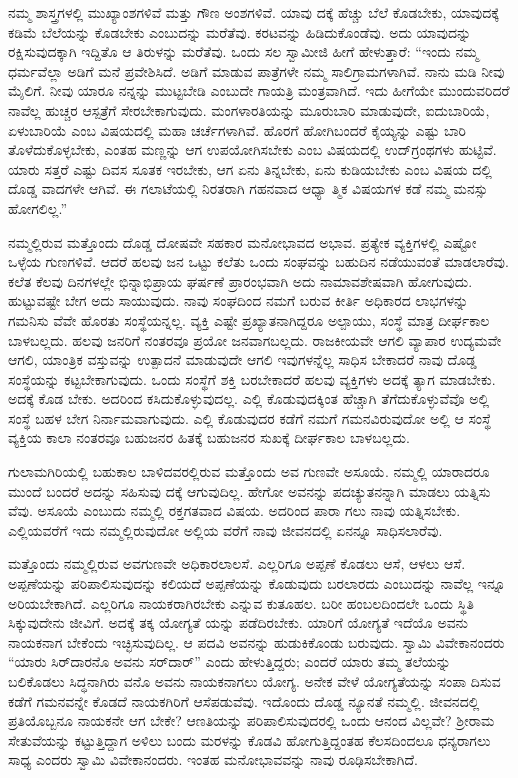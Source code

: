 ನಮ್ಮ ಶಾಸ್ತ್ರಗಳಲ್ಲಿ ಮುಖ್ಯಾಂಶಗಳಿವೆ ಮತ್ತು ಗೌಣ ಅಂಶಗಳಿವೆ. ಯಾವು ದಕ್ಕೆ ಹೆಚ್ಚು ಬೆಲೆ ಕೊಡಬೇಕು, ಯಾವುದಕ್ಕೆ ಕಡಿಮೆ ಬೆಲೆಯನ್ನು ಕೊಡಬೇಕು ಎಂಬುದನ್ನು ಮರೆತೆವು. ಕರಟವನ್ನು ಹಿಡಿದುಕೊಂಡೆವು. ಅದು ಯಾವುದನ್ನು ರಕ್ಷಿಸುವುದಕ್ಕಾಗಿ ಇದ್ದಿತೊ ಆ ತಿರುಳನ್ನು ಮರೆತೆವು. ಒಂದು ಸಲ ಸ್ವಾಮೀಜಿ ಹೀಗೆ ಹೇಳುತ್ತಾರೆ: “ಇಂದು ನಮ್ಮ ಧರ್ಮವೆಲ್ಲಾ ಅಡಿಗೆ ಮನೆ ಪ್ರವೇಶಿಸಿದೆ. ಅಡಿಗೆ ಮಾಡುವ ಪಾತ್ರೆಗಳೇ ನಮ್ಮ ಸಾಲಿಗ್ರಾಮಗಳಾಗಿವೆ. ನಾನು ಮಡಿ ನೀವು ಮೈಲಿಗೆ. ನೀವು ಯಾರೂ ನನ್ನನ್ನು ಮುಟ್ಟಬೇಡಿ ಎಂಬುದೇ ಗಾಯತ್ರಿ ಮಂತ್ರವಾಗಿದೆ. ಇದು ಹೀಗೆಯೇ ಮುಂದುವರಿದರೆ ನಾವೆಲ್ಲ ಹುಚ್ಚರ ಆಸ್ಪತ್ರೆಗೆ ಸೇರಬೇಕಾಗುವುದು. ಮಂಗಳಾರತಿಯನ್ನು ಮೂರುಬಾರಿ ಮಾಡುವುದೇ, ಐದುಬಾರಿಯೆ, ಏಳುಬಾರಿಯೆ ಎಂಬ ವಿಷಯದಲ್ಲಿ ಮಹಾ ಚರ್ಚೆಗಳಾಗಿವೆ. ಹೊರಗೆ ಹೋಗಿಬಂದರೆ ಕೈಯ್ಯನ್ನು ಎಷ್ಟು ಬಾರಿ ತೊಳೆದುಕೊಳ್ಳಬೇಕು, ಎಂತಹ ಮಣ್ಣನ್ನು ಆಗ ಉಪಯೋಗಿಸಬೇಕು ಎಂಬ ವಿಷಯದಲ್ಲಿ ಉದ್​ಗ್ರಂಥಗಳು ಹುಟ್ಟಿವೆ. ಯಾರು ಸತ್ತರೆ ಎಷ್ಟು ದಿವಸ ಸೂತಕ ಇರಬೇಕು, ಆಗ ಏನು ತಿನ್ನಬೇಕು, ಏನು ಕುಡಿಯಬೇಕು ಎಂಬ ವಿಷಯ ದಲ್ಲಿ ದೊಡ್ಡ ವಾದಗಳೇ ಆಗಿವೆ. ಈ ಗಲಾಟೆಯಲ್ಲಿ ನಿರತರಾಗಿ ಗಹನವಾದ ಆಧ್ಯಾ ತ್ಮಿಕ ವಿಷಯಗಳ ಕಡೆ ನಮ್ಮ ಮನಸ್ಸು ಹೋಗಲಿಲ್ಲ.”

ನಮ್ಮಲ್ಲಿರುವ ಮತ್ತೊಂದು ದೊಡ್ಡ ದೋಷವೇ ಸಹಕಾರ ಮನೋಭಾವದ ಅಭಾವ. ಪ್ರತ್ಯೇಕ ವ್ಯಕ್ತಿಗಳಲ್ಲಿ ಎಷ್ಟೋ ಒಳ್ಳೆಯ ಗುಣಗಳಿವೆ. ಆದರೆ ಹಲವು ಜನ ಒಟ್ಟು ಕಲೆತು ಒಂದು ಸಂಘವನ್ನು ಬಹುದಿನ ನಡೆಯುವಂತೆ ಮಾಡಲಾರೆವು. ಕಲೆತ ಕೆಲವು ದಿನಗಳಲ್ಲೇ ಭಿನ್ನಾಭಿಪ್ರಾಯ ಘರ್ಷಣೆ ಪ್ರಾರಂಭವಾಗಿ ಅದು ನಾಮಾವಶೇಷವಾಗಿ ಹೋಗುವುದು. ಹುಟ್ಟುವಷ್ಟೇ ಬೇಗ ಅದು ಸಾಯುವುದು. ನಾವು ಸಂಘದಿಂದ ನಮಗೆ ಬರುವ ಕೀರ್ತಿ ಅಧಿಕಾರದ ಲಾಭಗಳನ್ನು ಗಮನಿಸು ವೆವೇ ಹೊರತು ಸಂಸ್ಥೆಯನ್ನಲ್ಲ. ವ್ಯಕ್ತಿ ಎಷ್ಟೇ ಪ್ರಖ್ಯಾತನಾಗಿದ್ದರೂ ಅಲ್ಪಾಯು, ಸಂಸ್ಥೆ ಮಾತ್ರ ದೀರ್ಘಕಾಲ ಬಾಳಬಲ್ಲದು. ಹಲವು ಜನರಿಗೆ ನಂತರವೂ ಪ್ರಯೋ ಜನವಾಗಬಲ್ಲದು. ರಾಜಕೀಯವೇ ಆಗಲಿ ವ್ಯಾಪಾರ ಉದ್ಯಮವೇ ಆಗಲಿ, ಯಾಂತ್ರಿಕ ವಸ್ತುವನ್ನು ಉತ್ಪಾದನೆ ಮಾಡುವುದೇ ಆಗಲಿ ಇವುಗಳನ್ನೆಲ್ಲ ಸಾಧಿಸ ಬೇಕಾದರೆ ನಾವು ದೊಡ್ಡ ಸಂಸ್ಥೆಯನ್ನು ಕಟ್ಟಬೇಕಾಗುವುದು. ಒಂದು ಸಂಸ್ಥೆಗೆ ಶಕ್ತಿ ಬರಬೇಕಾದರೆ ಹಲವು ವ್ಯಕ್ತಿಗಳು ಅದಕ್ಕೆ ತ್ಯಾಗ ಮಾಡಬೇಕು. ಅದಕ್ಕೆ ಕೊಡ ಬೇಕು. ಅದರಿಂದ ಕಸಿದುಕೊಳ್ಳುವುದಲ್ಲ. ಎಲ್ಲಿ ಕೊಡುವುದಕ್ಕಿಂತ ಹೆಚ್ಚಾಗಿ ತೆಗೆದುಕೊಳ್ಳುವೆವೊ ಅಲ್ಲಿ ಸಂಸ್ಥೆ ಬಹಳ ಬೇಗ ನಿರ್ನಾಮವಾಗುವುದು. ಎಲ್ಲಿ ಕೊಡುವುದರ ಕಡೆಗೆ ನಮಗೆ ಗಮನವಿರುವುದೋ ಅಲ್ಲಿ ಆ ಸಂಸ್ಥೆ ವ್ಯಕ್ತಿಯ ಕಾಲಾ ನಂತರವೂ ಬಹುಜನರ ಹಿತಕ್ಕೆ ಬಹುಜನರ ಸುಖಕ್ಕೆ ದೀರ್ಘಕಾಲ ಬಾಳಬಲ್ಲದು.

ಗುಲಾಮಗಿರಿಯಲ್ಲಿ ಬಹುಕಾಲ ಬಾಳಿದವರಲ್ಲಿರುವ ಮತ್ತೊಂದು ಅವ ಗುಣವೇ ಅಸೂಯೆ. ನಮ್ಮಲ್ಲಿ ಯಾರಾದರೂ ಮುಂದೆ ಬಂದರೆ ಅದನ್ನು ಸಹಿಸುವು ದಕ್ಕೆ ಆಗುವುದಿಲ್ಲ. ಹೇಗೋ ಅವನನ್ನು ಪದಚ್ಯುತನನ್ನಾಗಿ ಮಾಡಲು ಯತ್ನಿಸು ವೆವು. ಅಸೂಯೆ ಎಂಬುದು ನಮ್ಮಲ್ಲಿ ರಕ್ತಗತವಾದ ವಿಷಯ. ಅದರಿಂದ ಪಾರಾ ಗಲು ನಾವು ಯತ್ನಿಸಬೇಕು. ಎಲ್ಲಿಯವರೆಗೆ ಇದು ನಮ್ಮಲ್ಲಿರುವುದೋ ಅಲ್ಲಿಯ ವರೆಗೆ ನಾವು ಜೀವನದಲ್ಲಿ ಏನನ್ನೂ ಸಾಧಿಸಲಾರೆವು.

ಮತ್ತೊಂದು ನಮ್ಮಲ್ಲಿರುವ ಅವಗುಣವೇ ಅಧಿಕಾರಲಾಲಸೆ. ಎಲ್ಲರಿಗೂ ಅಪ್ಪಣೆ ಕೊಡಲು ಆಸೆ, ಆಳಲು ಆಸೆ. ಅಪ್ಪಣೆಯನ್ನು ಪರಿಪಾಲಿಸುವುದನ್ನು ಕಲಿಯದೆ ಅಪ್ಪಣೆಯನ್ನು ಕೊಡುವುದು ಬರಲಾರದು ಎಂಬುದನ್ನು ನಾವೆಲ್ಲ ಇನ್ನೂ ಅರಿಯಬೇಕಾಗಿದೆ. ಎಲ್ಲರಿಗೂ ನಾಯಕರಾಗಿರಬೇಕು ಎನ್ನುವ ಕುತೂಹಲ. ಬರೀ ಹಂಬಲದಿಂದಲೇ ಒಂದು ಸ್ಥಿತಿ ಸಿಕ್ಕುವುದೇನು ಜೀವಿಗೆ. ಅದಕ್ಕೆ ತಕ್ಕ ಯೋಗ್ಯತೆ ಯನ್ನು ಪಡೆದಿರಬೇಕು. ಯಾರಿಗೆ ಯೋಗ್ಯತೆ ಇದೆಯೊ ಅವನು ನಾಯಕನಾಗ ಬೇಕೆಂದು ಇಚ್ಛಿಸುವುದಿಲ್ಲ. ಆ ಪದವಿ ಅವನನ್ನು ಹುಡುಕಿಕೊಂಡು ಬರುವುದು. ಸ್ವಾಮಿ ವಿವೇಕಾನಂದರು “ಯಾರು ಸಿರ್​ದಾರನೊ ಅವನು ಸರ್​ದಾರ್​” ಎಂದು ಹೇಳುತ್ತಿದ್ದರು; ಎಂದರೆ ಯಾರು ತಮ್ಮ ತಲೆಯನ್ನು ಬಲಿಕೊಡಲು ಸಿದ್ಧನಾಗಿರು ವನೊ ಅವನು ನಾಯಕನಾಗಲು ಯೋಗ್ಯ. ಅನೇಕ ವೇಳೆ ಯೋಗ್ಯತೆಯನ್ನು ಸಂಪಾ ದಿಸುವ ಕಡೆಗೆ ಗಮನವನ್ನೇ ಕೊಡದೆ ನಾಯಕಗಿರಿಗೆ ಆಸೆಪಡುವೆವು. ಇದೊಂದು ದೊಡ್ಡ ನ್ಯೂನತೆ ನಮ್ಮಲ್ಲಿ. ಜೀವನದಲ್ಲಿ ಪ್ರತಿಯೊಬ್ಬನೂ ನಾಯಕನೇ ಆಗ ಬೇಕೇ? ಆಣತಿಯನ್ನು ಪರಿಪಾಲಿಸುವುದರಲ್ಲಿ ಒಂದು ಆನಂದ ವಿಲ್ಲವೇ? ಶ್ರೀರಾಮ ಸೇತುವೆಯನ್ನು ಕಟ್ಟುತ್ತಿದ್ದಾಗ ಅಳಿಲು ಬಂದು ಮರಳನ್ನು ಕೊಡವಿ ಹೋಗುತ್ತಿದ್ದಂತಹ ಕೆಲಸದಿಂದಲೂ ಧನ್ಯರಾಗಲು ಸಾಧ್ಯ ಎಂದರು ಸ್ವಾಮಿ ವಿವೇಕಾನಂದರು. ಇಂತಹ ಮನೋಭಾವವನ್ನು ನಾವು ರೂಢಿಸಬೇಕಾಗಿದೆ.

